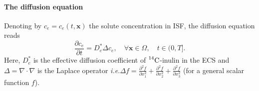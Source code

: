 \documentclass[10pt]{article}
\newcommand{\ie}{\emph{i.e.}\;}
\newcommand{\1}{^{(1)}}
\newcommand{\2}{^{(2)}}
\newcommand {\f}   {\frac}
\newcommand {\p}   {\partial}
\newcommand {\x}   {\mathbf{x}}
\newcommand {\vel}   {\mathbf{v}}
\newcommand{\Cinulin}{$\prescript{14}{}{\text{C}}$-inulin }
\newcommand{\commentout}[1]{}
\begin{document}
\paragraph{The diffusion equation}
Denoting by $c_e = c_e(t,\x)$ the solute concentration in ISF, the diffusion equation reads
\begin{equation}
    \f{\p c_e}{\p t} = D_e^* \Delta c_e , \quad \forall \x\in \Omega,\quad t\in (0,T].
    \label{eq:diffusion-convection}
\end{equation}
Here, $D_e^*$ is the effective diffusion coefficient of \Cinulin in the ECS and $\Delta = \nabla \cdot \nabla$ is the Laplace operator \ie $\Delta f = \frac{\partial^2 f}{\partial x_1^2} + \frac{\partial^2 f}{\partial x_2^2} + \frac{\partial^2 f}{\partial x_3^2}  $ (for a general scalar function $f$).
\commentout{
\paragraph{The pressure equation.}
To represent the movement of the interstitial fluid, we use a compressibility relation that links the density of the fluid $\rho = \rho(t,\x)$ to its pressure $p_e = p_e(t,\x)$ (see Appendix~\ref{app:derivation} for the details of this computation). The time-space evolution of the pressure is given by
\begin{equation}
    C_e \frac{\partial p_e}{\partial t} +  \nabla\cdot( v_e ) +  C_e v_e  \cdot \nabla p_e = 0,\quad \forall x\in \Omega,\quad t\in (0,T],
    \label{eq:pressure-1comp}
\end{equation}
in which $C_e$ is the compressibility coefficient.  
}
\end{document}
